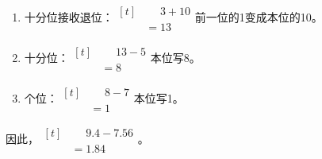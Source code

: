 {\begin{enumerate}[leftmargin=1.7em,itemsep=5pt,topsep=0pt]
\item 十分位接收退位：\(\begin{aligned}[t]&\phantom{={}}3+10\\&=13\end{aligned}\)\quad 前一位的1变成本位的10。
\item 十分位：\(\begin{aligned}[t]&\phantom{={}}13-5\\&=8\end{aligned}\)\quad 本位写8。
\item 个位：\(\begin{aligned}[t]&\phantom{={}}8-7\\&=1\end{aligned}\)\quad 本位写1。
\end{enumerate}
\par\smallskip
因此，\(\begin{aligned}[t]&\phantom{={}}9.4-7.56\\&=1.84\end{aligned}\)。
\par\medskip

}

